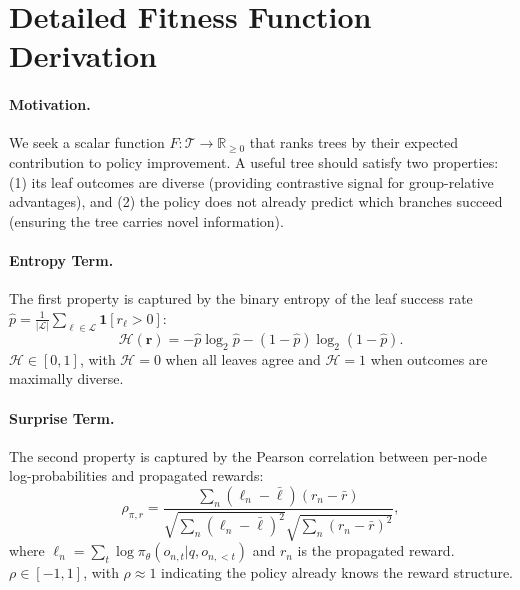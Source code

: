 \documentclass{article} %
\begin{document}




\appendix

\section{Detailed Fitness Function Derivation}
\label{app:fitness_derivation}

\paragraph{Motivation.} We seek a scalar function $F: \mathcal{T} \to \mathbb{R}_{\ge 0}$ that ranks trees by their expected contribution to policy improvement. A useful tree should satisfy two properties: (1) its leaf outcomes are diverse (providing contrastive signal for group-relative advantages), and (2) the policy does not already predict which branches succeed (ensuring the tree carries novel information).

\paragraph{Entropy Term.} The first property is captured by the binary entropy of the leaf success rate $\hat{p} = \frac{1}{|\mathcal{L}|} \sum_{\ell \in \mathcal{L}} \mathbf{1}[r_\ell > 0]$:
\begin{equation}
    \mathcal{H}(\mathbf{r}) = -\hat{p} \log_2 \hat{p} - (1 - \hat{p}) \log_2(1 - \hat{p}).
\end{equation}
$\mathcal{H} \in [0, 1]$, with $\mathcal{H} = 0$ when all leaves agree and $\mathcal{H} = 1$ when outcomes are maximally diverse.

\paragraph{Surprise Term.} The second property is captured by the Pearson correlation between per-node log-probabilities and propagated rewards:
\begin{equation}
    \rho_{\pi,r} = \frac{\sum_{n} (\ell_n - \bar{\ell})(r_n - \bar{r})}{\sqrt{\sum_n (\ell_n - \bar{\ell})^2} \sqrt{\sum_n (r_n - \bar{r})^2}},
\end{equation}
where $\ell_n = \sum_t \log \pi_\theta(o_{n,t} | q, o_{n,<t})$ and $r_n$ is the propagated reward. $\rho \in [-1, 1]$, with $\rho \approx 1$ indicating the policy already knows the reward structure.
\end{document}
